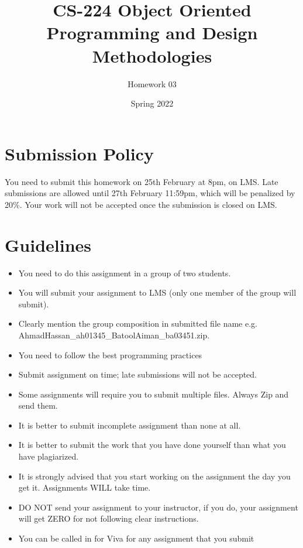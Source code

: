 \documentclass[a4paper,12pt]{article}
\begin{document}
	
	\title{CS-224 Object Oriented Programming and Design Methodologies }
	\author{Homework 03}
	\date{Spring 2022}
	\maketitle
	
	
	\section{Submission Policy}
	You need to submit this homework on  {\color{blue}25th February at 8pm}, on LMS. Late submissions are allowed until {\color{red} 27th February 11:59pm}, which will be penalized by 20\%. Your work will not be accepted once the submission is closed on LMS.
	

	\section{Guidelines}
	\begin{itemize}
		\item You need to do this assignment in a group of two students.
		\item You will submit your assignment to LMS (only one member of the group will submit).
		\item Clearly mention the group composition in submitted file name e.g. AhmadHassan\_ah01345\_BatoolAiman\_ba03451.zip. 
		\item You need to follow the best programming practices 
		\item Submit assignment on time; late submissions will not be accepted.
		\item Some assignments will require you to submit multiple files. Always Zip and send them.
		\item It is better to submit incomplete assignment than none at all.
		\item It is better to submit the work that you have done yourself than what you have plagiarized.
		\item It is strongly advised that you start working on the assignment the day you get it. Assignments WILL take time.
		\item DO NOT send your assignment to your instructor, if you do, your assignment will get ZERO for not following clear instructions.
		\item You can be called in for Viva for any assignment that you submit
	\end{itemize}
	
\end{document}
